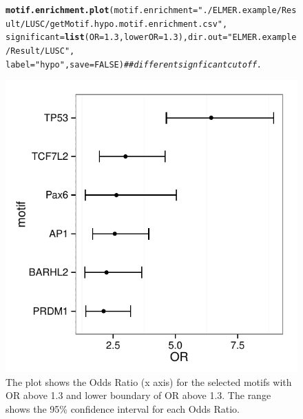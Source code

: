\documentclass{article}\usepackage[]{graphicx}\usepackage[usenames,dvipsnames]{color}
\makeatletter
\def\maxwidth{ %
  \ifdim\Gin@nat@width>\linewidth
    \linewidth
  \else
    \Gin@nat@width
  \fi
}
\newcommand{\hlnum}[1]{\textcolor[rgb]{0.686,0.059,0.569}{#1}}%
\newcommand{\hlstr}[1]{\textcolor[rgb]{0.192,0.494,0.8}{#1}}%
\newcommand{\hlcom}[1]{\textcolor[rgb]{0.678,0.584,0.686}{\textit{#1}}}%
\newcommand{\hlstd}[1]{\textcolor[rgb]{0.345,0.345,0.345}{#1}}%
\newcommand{\hlkwc}[1]{\textcolor[rgb]{0.333,0.667,0.333}{#1}}%
\newcommand{\hlkwd}[1]{\textcolor[rgb]{0.737,0.353,0.396}{\textbf{#1}}}%
\newenvironment{kframe}{%
 \def\at@end@of@kframe{}%
 \ifinner\ifhmode%
  \def\at@end@of@kframe{\end{minipage}}%
  \begin{minipage}{\columnwidth}%
 \fi\fi%
 \def\FrameCommand##1{\hskip\@totalleftmargin \hskip-\fboxsep
 \colorbox{shadecolor}{##1}\hskip-\fboxsep
     \hskip-\linewidth \hskip-\@totalleftmargin \hskip\columnwidth}%
 \MakeFramed {\advance\hsize-\width
   \@totalleftmargin\z@ \linewidth\hsize
   \@setminipage}}%
 {\par\unskip\endMakeFramed%
 \at@end@of@kframe}
\newenvironment{knitrout}{}{} %
\makeatother
\begin{document}
\begin{figure}[H]
\begin{knitrout}
\color{fgcolor}\begin{kframe}
\begin{alltt}
\hlkwd{motif.enrichment.plot}\hlstd{(}\hlkwc{motif.enrichment}\hlstd{=}\hlstr{"./ELMER.example/Result/LUSC/getMotif.hypo.motif.enrichment.csv"}\hlstd{,}
                      \hlkwc{significant}\hlstd{=}\hlkwd{list}\hlstd{(}\hlkwc{OR}\hlstd{=}\hlnum{1.3}\hlstd{,}\hlkwc{lowerOR}\hlstd{=}\hlnum{1.3}\hlstd{),} \hlkwc{dir.out} \hlstd{=}\hlstr{"ELMER.example/Result/LUSC"}\hlstd{,}
                      \hlkwc{label}\hlstd{=}\hlstr{"hypo"}\hlstd{,} \hlkwc{save}\hlstd{=}\hlnum{FALSE}\hlstd{)}  \hlcom{## different signficant cut off.}
\end{alltt}
\end{kframe}

{\centering \includegraphics[width=\maxwidth]{figure/figure6-1} 

}



\end{knitrout}
\protect\caption{The plot shows the Odds Ratio (x axis) 
for the selected motifs with OR above 1.3 and lower boundary of OR above 1.3. 
The range shows the 95\% confidence interval for each Odds Ratio.
\label{fig:figure6}}
\end{figure}
\end{document}
